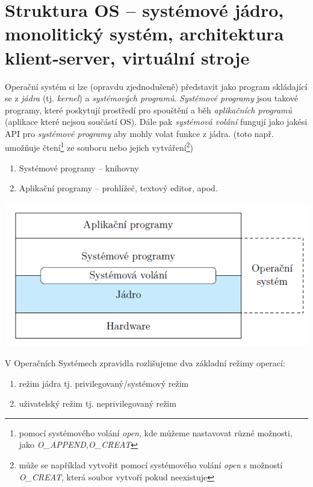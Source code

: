 \section{Struktura OS – systémové jádro, monolitický systém, architektura klient-server, virtuální stroje} \label{kernel}

Operační systém si lze (opravdu zjednodušeně) představit jako program skládající se z \textit{jádra} (tj. \textit{kernel}) a \textit{systémových programů}. \textit{Systémové programy} jsou takové programy, které poskytují prostředí pro spouštění a běh \textit{aplikačních programů} (aplikace které nejsou součástí OS). Dále pak  \textit{systémová volání} fungují jako jakési API pro \textit{systémové programy} aby mohly volat funkce z jádra. (toto např. umožňuje čtení\footnote{pomocí systémového volání \textit{open}, kde můžeme nastavovat různé možnosti, jako \textit{O\_APPEND,O\_CREAT}} ze souboru nebo jejich vytváření\footnote{může se například vytvořit pomocí systémového volání \textit{open} s možností \textit{O\_CREAT}, která soubor vytvoří pokud neexistuje})

\begin{enumerate}
    \item Systémové programy -- knihovny
    \item Aplikační programy -- prohlížeč, textový editor, apod. 
\end{enumerate}
    
\begin{center}
    \includegraphics[scale=1]{BPC-SOS/images/OS_kernel_apps.png}
\end{center}

V Operačních Systémech zpravidla rozlišujeme dva základní režimy operací:

\begin{enumerate}
    \item režim jádra tj. privilegovaný/systémový režim
    \item uživatelský režim tj. neprivilegovaný režim
\end{enumerate}

